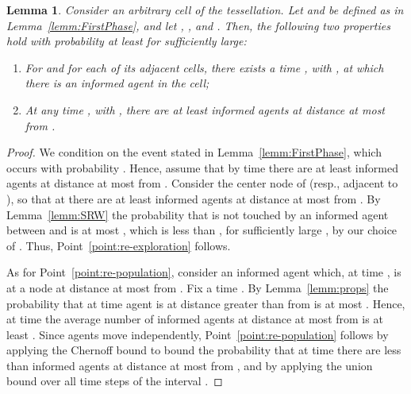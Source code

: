 \documentclass[11pt]{article}
\newtheorem{lemm}{Lemma}
\begin{document}
\begin{lemm}
\label{lemm:SecondPhase}
Consider an arbitrary  cell  of the tessellation.
Let  and  be defined as in
Lemma~\ref{lemm:FirstPhase}, and let
,
,
and .
Then, the following two properties hold with probability
at least  for  sufficiently large:
\begin{enumerate}
\item\label{point:re-exploration}
For  and for each of its adjacent cells,
there exists a time , with ,
at which there is an informed agent in the cell;
\item\label{point:re-population}
At any time , with , there are
at least  informed agents at distance
at most  from .
\end{enumerate}
\end{lemm}
\begin{proof}
We condition on the event stated in Lemma~\ref{lemm:FirstPhase},
which occurs with probability .
Hence, assume that by time  there
are at least  informed agents at distance
at most  from .
Consider the center node  of  (resp.,  adjacent to ),
so that at  there are at least 
informed agents at distance at most  from .
By Lemma~\ref{lemm:SRW} the probability that  is not touched by an
informed agent between  and  is at most
,
which is less than , for sufficiently large ,
by our choice of .
Thus, Point~\ref{point:re-exploration} follows.

As for Point~\ref{point:re-population}, consider an informed agent  which,
at time , is at a node  at distance
at most  from .
Fix a time .
By Lemma~\ref{lemm:props} the probability that at time  agent  is
at distance greater than  from  is at most .
Hence, at time  the average number of informed agents at distance
at most  from  is at least .
Since agents move independently,
Point~\ref{point:re-population} follows by applying the
Chernoff bound to bound the probability that at time  there are
less than  informed agents at distance
at most  from , and by applying the union bound
over all time steps of the interval .
\end{proof}
\end{document}
